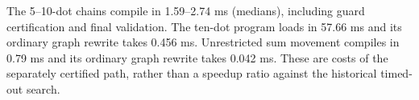 The 5--10-dot chains compile in 1.59--2.74 ms (medians), including guard certification and final validation. The ten-dot program loads in 57.66 ms and its ordinary graph rewrite takes 0.456 ms. Unrestricted sum movement compiles in 0.79 ms and its ordinary graph rewrite takes 0.042 ms. These are costs of the separately certified path, rather than a speedup ratio against the historical timed-out search.
